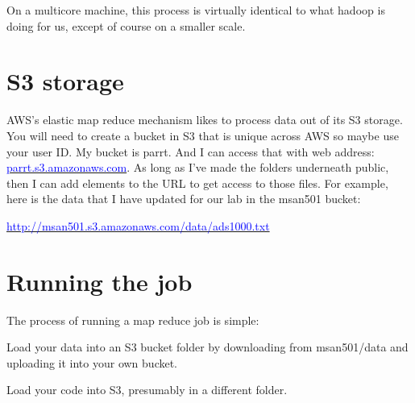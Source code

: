 \begin{fullwidth}
On a multicore machine, this process is virtually identical to what hadoop is doing for us, except of course on a smaller scale.

\section{S3 storage}

AWS's elastic map reduce mechanism likes to process data out of its S3 storage. You will need to create a bucket in S3 that is unique across AWS so maybe use your user ID. My bucket is parrt. And I can access that with web address: \href{https://parrt.s3.amazonaws.com}{\textcolor{blue}{parrt.s3.amazonaws.com}}. As long as I've made the folders underneath public, then I can add elements to the URL to get access to those files. For example, here is the data that I have updated for our lab in the msan501 bucket:

\href{http://msan501.s3.amazonaws.com/data/ads1000.txt}{\textcolor{blue}{http://msan501.s3.amazonaws.com/data/ads1000.txt}}

\section{Running the job}

The process of running a map reduce job is simple:

\step Load your data into an S3 bucket folder by downloading from msan501/data and uploading it into your own bucket.


\step Load your code into S3, presumably in a different folder.



\end{fullwidth}
